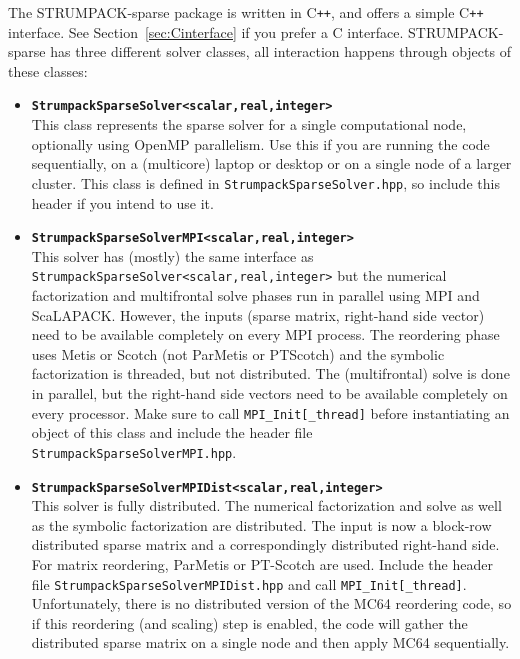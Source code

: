 \documentclass{article}
\begin{document}
The STRUMPACK-sparse package is written in C\texttt{++}, and offers
a simple C\texttt{++} interface. See Section~\ref{sec:Cinterface} if
you prefer a C interface. STRUMPACK-sparse has three different solver
classes, all interaction happens through objects of these classes:
\begin{itemize}
\item \textbf{\lstinline[style=C]!StrumpackSparseSolver<scalar,real,integer>!}\\
  This class represents the sparse solver for a single computational
  node, optionally using OpenMP parallelism. Use this if you are
  running the code sequentially, on a (multicore) laptop or desktop or
  on a single node of a larger cluster. This class is defined in
  \lstinline[style=Bash]!StrumpackSparseSolver.hpp!, so include this
  header if you intend to use it.
\item \textbf{\lstinline[style=C]!StrumpackSparseSolverMPI<scalar,real,integer>!}\\
  This solver has (mostly) the same interface as
  \lstinline[style=C]!StrumpackSparseSolver<scalar,real,integer>!  but
  the numerical factorization and multifrontal solve phases run in
  parallel using MPI and ScaLAPACK. However, the inputs (sparse
  matrix, right-hand side vector) need to be available completely on
  every MPI process. The reordering phase uses Metis or Scotch (not
  ParMetis or PTScotch) and the symbolic factorization is threaded,
  but not distributed. The (multifrontal) solve is done in parallel,
  but the right-hand side vectors need to be available completely on
  every processor. Make sure to call
  \lstinline[style=C]!MPI_Init[_thread]!  before instantiating an
  object of this class and include the header file
  \lstinline[style=Bash]!StrumpackSparseSolverMPI.hpp!.
\item
  \textbf{\lstinline[style=C]!StrumpackSparseSolverMPIDist<scalar,real,integer>!}\\
  This solver is fully distributed. The numerical factorization and
  solve as well as the symbolic factorization are distributed. The
  input is now a block-row distributed sparse matrix and a
  correspondingly distributed right-hand side. For matrix reordering,
  ParMetis or PT-Scotch are used. Include the header file
  \lstinline[style=Bash]!StrumpackSparseSolverMPIDist.hpp! and call
  \lstinline[style=C]!MPI_Init[_thread]!. Unfortunately, there is no
  distributed version of the MC64 reordering code, so if this
  reordering (and scaling) step is enabled, the code will gather the
  distributed sparse matrix on a single node and then apply MC64
  sequentially.
\end{itemize}
\end{document}

